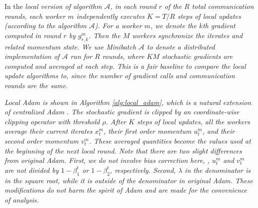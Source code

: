 \documentclass{article} %
\numberwithin{equation}{section}
\begin{document}
In the \em local \em version of algorithm $\mathcal{A}$, in each round $r$ of the $R$ total communication rounds, each worker $m$ independently executes $K = T/R$ steps of local updates (according to the algorithm $\mathcal{A}$). For a worker $m$, we denote the $k$th gradient computed in round $r$ by $g_{r,k}^m$. Then the $M$ workers synchronize the iterates and related momentum state.
We use \em Minibatch $\mathcal{A}$ \em to denote a distributed implementation of $\mathcal{A}$ run for $R$ rounds, where $KM$ stochastic gradients are computed and averaged at each step. This is a fair baseline to compare the local update algorithms to, since the number of gradient calls and communication rounds are the same.


\em Local \em Adam is shown in Algorithm \ref{alg:local_adam}, which is a natural extension of centralized Adam \citep{kingma2014adam}.
The stochastic gradient is clipped by an coordinate-wise clipping operator with threshold $\rho$.
After $K$ steps of local updates, all the workers average their current iterates $x_t^m$,  their first order momentum $u_t^m$, and their second order momentum $v_t^m$. These averaged quantities become the values used at the beginning of the next local round.
Note that there are two slight differences from original Adam.
First, we do not involve bias correction here, \ie, $u_t^m$ and $v_t^m$ are not divided by $1-\beta_1^t$ or $1-\beta_2^t$, respectively.
Second, $\lambda$ in the denominator is in the square root, while it is outside of the denominator in original Adam. 
These modifications do not harm the spirit of Adam and are made for the convenience of analysis. 
\end{document}
